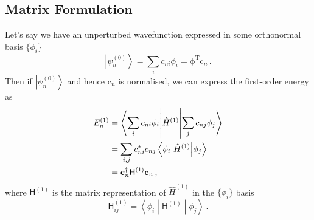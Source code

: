 \documentclass{article}
\theoremstyle{plain}\theoremheaderfont{\normalfont\itshape}\theorembodyfont{\rmfamily}\theoremseparator{.}\newtheorem*{rem}{Remark}\newtheorem*{ex}{Example}\newtheorem*{proof}{Proof}\newtheorem*{altp}{Alternative proof}
\theoremstyle{plain}\theoremheaderfont{\normalfont\bfseries}\theorembodyfont{\rmfamily}\theoremseparator{.}\newtheorem{thm}{Theorem}[section]\newtheorem{lem}[thm]{Lemma}\newtheorem{prop}[thm]{Proposition}\newtheorem*{cor}{Corollary}\newtheorem{defn}[thm]{Definition}\newtheorem{clm}[thm]{Claim}\newtheorem{clminproof}{Claim}
\theoremstyle{break}\theoremheaderfont{\normalfont\itshape}\theorembodyfont{\rmfamily}\theoremseparator{.\medskip}\newtheorem*{proofskip}{Proof}\newtheorem*{exs}{Examples}\newtheorem*{rems}{Remarks}
\theoremstyle{break}\theoremheaderfont{\normalfont\bfseries}\theorembodyfont{\rmfamily}\theoremseparator{.\medskip}\newtheorem{lemskip}[thm]{Lemma}\newtheorem{defnskip}[thm]{Definition}\newtheorem{propskip}[thm]{Proposition}\newtheorem{thmskip}[thm]{Theorem}
\numberwithin{equation}{section}
\newcommand{\tp}{^\mathrm{T}}
\newcommand{\ket}[1]{\left| #1 \right\rangle}
\newcommand{\mel}[3]{\left\langle #1 \middle| #2 \middle| #3 \right\rangle}
\newcommand{\vb}[1]{\bm{\mathrm{#1}}}
\begin{document}
    \subsection{Matrix Formulation}
    Let's say we have an unperturbed wavefunction expressed in some orthonormal basis \(\{\phi_i\}\)
    \begin{equation}
        \ket{\psi_n^{(0)}}=\sum_i c_{ni}\phi_i=\vb{\phi}\tp\vb{c}_n\,.
    \end{equation}
    Then if \(\ket{\psi_n^{(0)}}\) and hence \(\vb{c}_n\) is normalised, we can express the first-order energy as
    \begin{align}
        E_n^{(1)}&=\mel{\sum_i c_{ni}\phi_i}{\hat{H}^{(1)}}{\sum_j c_{nj}\phi_j}\notag \\
        &=\sum_{i,j} c_{ni}^* c_{nj}\mel{\phi_i}{\hat{H}^{(1)}}{\phi_j} \notag\\
        &=\vb{c}_n^\dagger\mathsf{H}^{(1)}\vb{c}_n\,,
    \end{align}
    where \(\mathsf{H}^{(1)}\) is the matrix representation of \(\hat{H}^{(1)}\) in the \(\{\phi_i\}\) basis
    \begin{equation}
        \mathsf{H}_{ij}^{(1)}=\mel{\phi_i}{\mathsf{H}^{(1)}}{\phi_j}\,.
    \end{equation}
\end{document}
